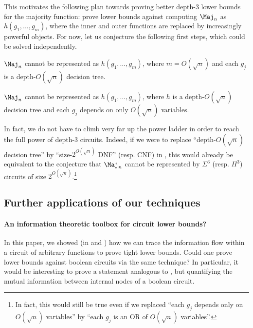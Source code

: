 This motivates the following plan towards proving better depth-3 lower bounds for the majority function:
prove lower bounds against computing $\Maj_n$ as $h(g_1, \ldots, g_m)$, where the inner and outer functions are replaced by increasingly powerful objects.
For now, let us conjecture the following first steps, which could be solved independently.

\begin{conjecture}
\label{conj:inner-power}
$\Maj_n$ cannot be represented as $h(g_1, \ldots, g_m)$, where $m = O(\sqrt{n})$ and each $g_j$ is a depth-$O(\sqrt{n})$ decision tree.
\end{conjecture}

\begin{conjecture}
\label{conj:outer-power}
$\Maj_n$ cannot be represented as $h(g_1, \ldots, g_m)$, where $h$ is a depth-$O(\sqrt{n})$ decision tree and each $g_j$ depends on only $O(\sqrt{n})$ variables.
\end{conjecture}

In fact, we do not have to climb very far up the power ladder in order to reach the full power of depth-3 circuits.
Indeed, if we were to replace ``depth-$O(\sqrt{n})$ decision tree'' by ``size-$2^{O(\sqrt{n})}$ DNF'' (resp. CNF) in , this would already be equivalent to the conjecture that $\Maj_n$ cannot be represented by $\Sigma^3$ (resp. $\Pi^3$) circuits of size $2^{O(\sqrt{n})}$.\footnote{In fact, this would still be true even if we replaced ``each $g_j$ depends only on $O(\sqrt{n})$ variables'' by ``each $g_j$ is an OR of $O(\sqrt{n})$ variables''.}

\subsection{Further applications of our techniques}

\paragraph*{An information theoretic toolbox for circuit lower bounds?} In this paper, we showed (in  and ) how we can trace the information flow within a circuit of arbitrary functions to prove tight lower bounds. Could one prove lower bounds against boolean circuits via the same technique? In particular, it would be interesting to prove a statement analogous to , but quantifying the mutual information between internal nodes of a boolean circuit. 

